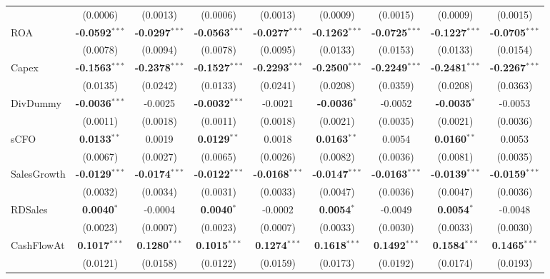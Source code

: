 \begin{landscape}
\begin{table}[H]
\begin{tabular}{lcccccccc}
 & (0.0006) & (0.0013) & (0.0006) & (0.0013) & (0.0009) & (0.0015) & (0.0009) & (0.0015) \\
ROA & \textbf{-0.0592}$^{***}$ & \textbf{-0.0297}$^{***}$ & \textbf{-0.0563}$^{***}$ & \textbf{-0.0277}$^{***}$ & \textbf{-0.1262}$^{***}$ & \textbf{-0.0725}$^{***}$ & \textbf{-0.1227}$^{***}$ & \textbf{-0.0705}$^{***}$ \\
 & (0.0078) & (0.0094) & (0.0078) & (0.0095) & (0.0133) & (0.0153) & (0.0133) & (0.0154) \\
Capex & \textbf{-0.1563}$^{***}$ & \textbf{-0.2378}$^{***}$ & \textbf{-0.1527}$^{***}$ & \textbf{-0.2293}$^{***}$ & \textbf{-0.2500}$^{***}$ & \textbf{-0.2249}$^{***}$ & \textbf{-0.2481}$^{***}$ & \textbf{-0.2267}$^{***}$ \\
 & (0.0135) & (0.0242) & (0.0133) & (0.0241) & (0.0208) & (0.0359) & (0.0208) & (0.0363) \\
DivDummy & \textbf{-0.0036}$^{***}$ & -0.0025 & \textbf{-0.0032}$^{***}$ & -0.0021 & \textbf{-0.0036}$^{*}$ & -0.0052 & \textbf{-0.0035}$^{*}$ & -0.0053 \\
 & (0.0011) & (0.0018) & (0.0011) & (0.0018) & (0.0021) & (0.0035) & (0.0021) & (0.0036) \\
sCFO & \textbf{0.0133}$^{**}$ & 0.0019 & \textbf{0.0129}$^{**}$ & 0.0018 & \textbf{0.0163}$^{**}$ & 0.0054 & \textbf{0.0160}$^{**}$ & 0.0053 \\
 & (0.0067) & (0.0027) & (0.0065) & (0.0026) & (0.0082) & (0.0036) & (0.0081) & (0.0035) \\
SalesGrowth & \textbf{-0.0129}$^{***}$ & \textbf{-0.0174}$^{***}$ & \textbf{-0.0122}$^{***}$ & \textbf{-0.0168}$^{***}$ & \textbf{-0.0147}$^{***}$ & \textbf{-0.0163}$^{***}$ & \textbf{-0.0139}$^{***}$ & \textbf{-0.0159}$^{***}$ \\
 & (0.0032) & (0.0034) & (0.0031) & (0.0033) & (0.0047) & (0.0036) & (0.0047) & (0.0036) \\
RDSales & \textbf{0.0040}$^{*}$ & -0.0004 & \textbf{0.0040}$^{*}$ & -0.0002 & \textbf{0.0054}$^{*}$ & -0.0049 & \textbf{0.0054}$^{*}$ & -0.0048 \\
 & (0.0023) & (0.0007) & (0.0023) & (0.0007) & (0.0033) & (0.0030) & (0.0033) & (0.0030) \\
CashFlowAt & \textbf{0.1017}$^{***}$ & \textbf{0.1280}$^{***}$ & \textbf{0.1015}$^{***}$ & \textbf{0.1274}$^{***}$ & \textbf{0.1618}$^{***}$ & \textbf{0.1492}$^{***}$ & \textbf{0.1584}$^{***}$ & \textbf{0.1465}$^{***}$ \\
 & (0.0121) & (0.0158) & (0.0122) & (0.0159) & (0.0173) & (0.0192) & (0.0174) & (0.0193) \\

\end{tabular}
\end{table}
\end{landscape}
